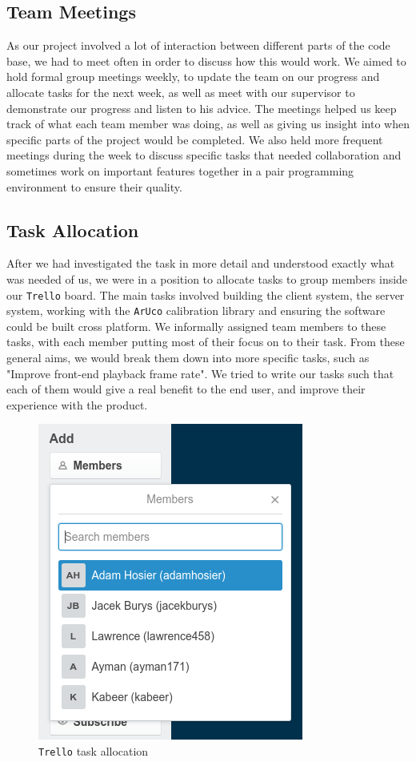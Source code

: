 \documentclass{article}
\begin{document}
\subsection{Team Meetings}
As our project involved a lot of interaction between different parts of the code base, we had to meet often in order to discuss how this would work. We aimed to hold formal group meetings weekly, to update the team on our progress and allocate tasks for the next week, as well as meet with our supervisor to demonstrate our progress and listen to his advice. The meetings helped us keep track of what each team member was doing, as well as giving us insight into when specific parts of the project would be completed. We also held more frequent meetings during the week to discuss specific tasks that needed collaboration and sometimes work on important features together in a pair programming environment to ensure their quality. 
\subsection{Task Allocation}
After we had investigated the task in more detail and understood exactly what was needed of us, we were in a position to allocate tasks to group members inside our \texttt{Trello} \cite{trello} board. The main tasks involved building the client system, the server system, working with the \texttt{ArUco} \cite{aruco} calibration library and ensuring the software could be built cross platform. We informally assigned team members to these tasks, with each member putting most of their focus on to their task. From these general aims, we would break them down into more specific tasks, such as "Improve front-end playback frame rate". We tried to write our tasks such that each of them would give a real benefit to the end user, and improve their experience with the product.
\begin{figure}[h]
  \centering
  \includegraphics[scale=0.5]{trello2}
  \caption{\texttt{Trello} \cite{trello} task allocation}
  \label{fig:trelloTasks}
\end{figure}
\end{document}
